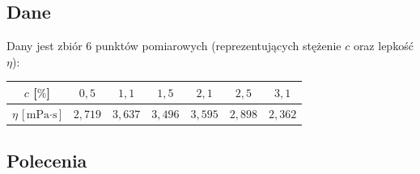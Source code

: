 \documentclass[a4paper,11pt]{article}
\begin{document}
\subsection*{Dane}

Dany jest zbiór 6 punktów pomiarowych (reprezentujących stężenie $c$ oraz lepkość $\eta$):

\begin{center}
\begin{tabular}{c|cccccc}
  \toprule
  $c$ [$\%$] & $0{,}5$ & $1{,}1$ & $1{,}5$ & $2{,}1$ & $2{,}5$ & $3{,}1$ \\
  \midrule
  $\eta$ [$\text{mPa}\cdot\text{s}$] & $2{,}719$ & $3{,}637$ & $3{,}496$ & $3{,}595$ & $2{,}898$ & $2{,}362$ \\
  \bottomrule
\end{tabular}
\end{center}

\subsection*{Polecenia}
\end{document}

